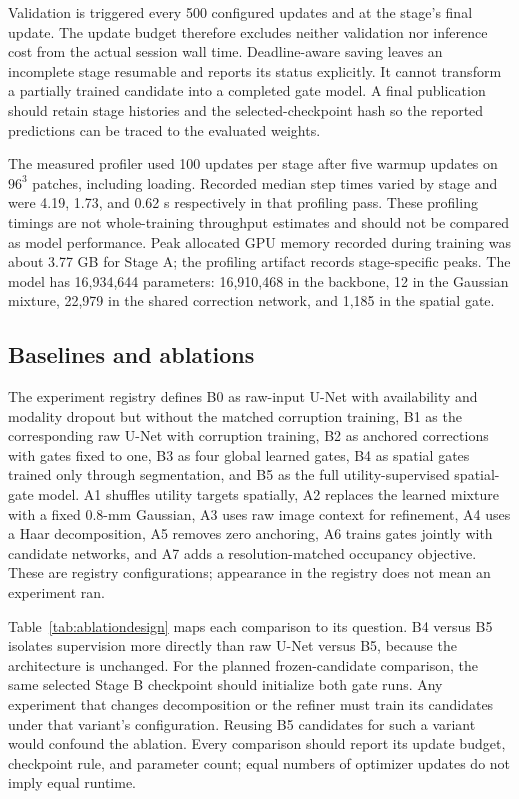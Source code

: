 \documentclass[conference]{IEEEtran}
\begin{document}
Validation is triggered every 500 configured updates and at the stage's final update. The update budget therefore excludes neither validation nor inference cost from the actual session wall time. Deadline-aware saving leaves an incomplete stage resumable and reports its status explicitly. It cannot transform a partially trained candidate into a completed gate model. A final publication should retain stage histories and the selected-checkpoint hash so the reported predictions can be traced to the evaluated weights.

The measured profiler used 100 updates per stage after five warmup updates on $96^3$ patches, including loading. Recorded median step times varied by stage and were 4.19, 1.73, and 0.62 s respectively in that profiling pass. These profiling timings are not whole-training throughput estimates and should not be compared as model performance. Peak allocated GPU memory recorded during training was about 3.77 GB for Stage A; the profiling artifact records stage-specific peaks. The model has 16,934,644 parameters: 16,910,468 in the backbone, 12 in the Gaussian mixture, 22,979 in the shared correction network, and 1,185 in the spatial gate.

\subsection{Baselines and ablations}
The experiment registry defines B0 as raw-input U-Net with availability and modality dropout but without the matched corruption training, B1 as the corresponding raw U-Net with corruption training, B2 as anchored corrections with gates fixed to one, B3 as four global learned gates, B4 as spatial gates trained only through segmentation, and B5 as the full utility-supervised spatial-gate model. A1 shuffles utility targets spatially, A2 replaces the learned mixture with a fixed 0.8-mm Gaussian, A3 uses raw image context for refinement, A4 uses a Haar decomposition, A5 removes zero anchoring, A6 trains gates jointly with candidate networks, and A7 adds a resolution-matched occupancy objective. These are registry configurations; appearance in the registry does not mean an experiment ran.

Table~\ref{tab:ablationdesign} maps each comparison to its question. B4 versus B5 isolates supervision more directly than raw U-Net versus B5, because the architecture is unchanged. For the planned frozen-candidate comparison, the same selected Stage B checkpoint should initialize both gate runs. Any experiment that changes decomposition or the refiner must train its candidates under that variant's configuration. Reusing B5 candidates for such a variant would confound the ablation. Every comparison should report its update budget, checkpoint rule, and parameter count; equal numbers of optimizer updates do not imply equal runtime.
\end{document}
